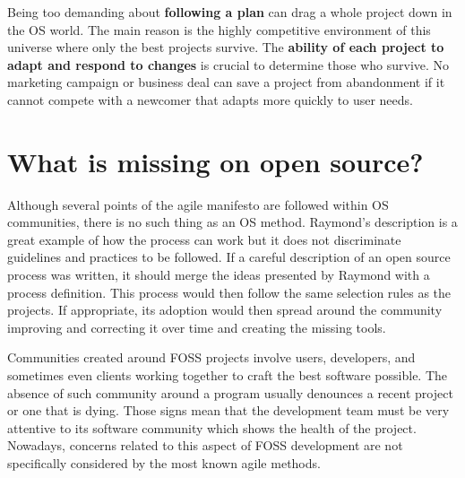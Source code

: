 Being too demanding about \textbf{following a plan} can drag a whole
project down in the OS world. The main reason is the highly
competitive environment of this universe where only the best projects
survive. The \textbf{ability of each project to adapt and respond to
  changes} is crucial to determine those who survive. No marketing
campaign or business deal can save a project from abandonment if it
cannot compete with a newcomer that adapts more quickly to user needs.

\section{What is missing on open source?}
\label{sec:os-summary}

Although several points of the agile manifesto are followed within OS
communities, there is no such thing as an OS method. Raymond's
description \cite{Raymond1999} is a great example of how the process
can work but it does not discriminate guidelines and practices to be
followed. If a careful description of an open source process was
written, it should merge the ideas presented by Raymond with a process
definition. This process would then follow the same selection rules as
the projects. If appropriate, its adoption would then spread around
the community improving and correcting it over time and creating the
missing tools.

Communities created around FOSS projects involve users, developers,
and sometimes even clients working together to craft the best software
possible. The absence of such community around a program usually
denounces a recent project or one that is dying. Those signs mean that
the development team must be very attentive to its software community
which shows the health of the project. Nowadays, concerns related to
this aspect of FOSS development are not specifically considered by the
most known agile methods.

